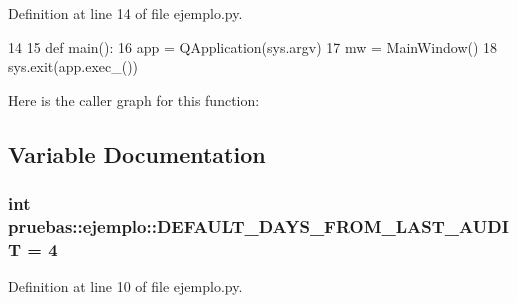\-Definition at line 14 of file ejemplo.\-py.


\begin{DoxyCode}
14 
15 def main():
16     app = QApplication(sys.argv)
17     mw = MainWindow()
18     sys.exit(app.exec_())

\end{DoxyCode}


\-Here is the caller graph for this function\-:




\subsection{\-Variable \-Documentation}
\subsubsection[{\-D\-E\-F\-A\-U\-L\-T\-\_\-\-D\-A\-Y\-S\-\_\-\-F\-R\-O\-M\-\_\-\-L\-A\-S\-T\-\_\-\-A\-U\-D\-I\-T}]{\setlength{\rightskip}{0pt plus 5cm}int {\bf pruebas\-::ejemplo\-::\-D\-E\-F\-A\-U\-L\-T\-\_\-\-D\-A\-Y\-S\-\_\-\-F\-R\-O\-M\-\_\-\-L\-A\-S\-T\-\_\-\-A\-U\-D\-I\-T} = 4}\label{namespacepruebas_1_1ejemplo_a8f463d2e773a2ad27a397a316fa88ffe}


\-Definition at line 10 of file ejemplo.\-py.

